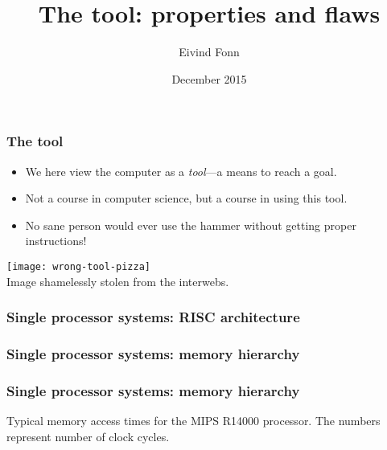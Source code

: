 

\title{The tool: properties and flaws}
\author{Eivind Fonn}
\date{December 2015}
\maketitle

\begin{frame}
  \frametitle{The tool}
  \begin{itemize}
    \item We here view the computer as a \emph{tool}---a means to reach a goal.
    \item Not a course in computer science, but a course in using this tool.
    \item No sane person would ever use the hammer without getting proper instructions!
  \end{itemize}
  \begin{center}
    \texttt{[image: wrong-tool-pizza]} \\
    Image shamelessly stolen from the interwebs.
  \end{center}
\end{frame}

\begin{frame}
  \frametitle{Single processor systems: RISC architecture}
  \begin{center}
    \scalebox{0.8}{
      
    }
  \end{center}
\end{frame}

\begin{frame}
  \frametitle{Single processor systems: memory hierarchy}
  \begin{center}
    \scalebox{0.8}{
      
    }
  \end{center}
\end{frame}

\begin{frame}
  \frametitle{Single processor systems: memory hierarchy}

  Typical memory access times for the MIPS R14000 processor. The numbers
  represent number of clock cycles.
  \begin{center}
    
  \end{center}
\end{frame}

